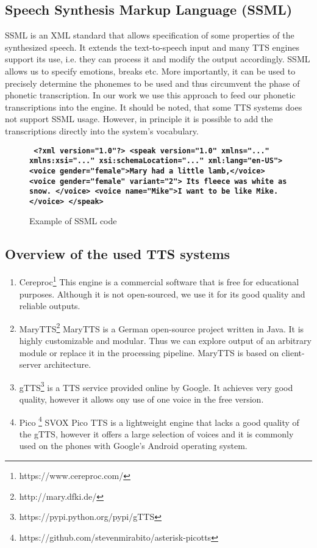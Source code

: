 \subsection*{Speech Synthesis Markup Language (SSML)}
\label{SSML}
\cite{taylor1997ssml}
SSML is an XML standard that allows specification of some properties of the synthesized speech.
It extends the text-to-speech input and many TTS engines support its use, i.e. they can process it and modify the output accordingly.
SSML allows us to specify emotions, breaks etc.
More importantly, it can be used to precisely determine the phonemes to be used and thus circumvent the phase of phonetic transcription.
In our work we use this approach to feed our phonetic transcriptions into the engine.
It should be noted, that some TTS systems does not support SSML usage.
However, in principle it is possible to add the transcriptions directly into the system's vocabulary.
\begin{center}
\begin{figure}
\textbf{\texttt{
<?xml version="1.0"?>
<speak version="1.0" xmlns="..."
         xmlns:xsi="..."
         xsi:schemaLocation="..."
         xml:lang="en-US">\linebreak
  \tab <voice gender="female">Mary had a little lamb,</voice>\linebreak
  \tab <voice gender="female" variant="2">\linebreak
  \tab\tab Its fleece was white as snow.\linebreak
  \tab</voice>\linebreak
  \tab<voice name="Mike">I want to be like Mike.</voice>\linebreak
</speak>
}}
\label{ssml_example}
\caption{Example of SSML code}
\end{figure}
\end{center}

\subsection*{Overview of the used TTS systems}
\begin{enumerate}
\item Cereproc\footnote{https://www.cereproc.com/}
This engine is a commercial software that is free for educational purposes.
Although it is not open-sourced, we use it for its good quality and reliable outputs.
\item MaryTTS\footnote{http://mary.dfki.de/} MaryTTS is a German open-source project written in Java.
It is highly customizable and modular.
Thus we can explore output of an arbitrary module or replace it in the processing pipeline.
MaryTTS is based on client-server architecture.
\item gTTS\footnote{https://pypi.python.org/pypi/gTTS} is a TTS service provided online by Google.
It achieves very good quality, however it allows ony use of one voice in the free version.
\item Pico \footnote{https://github.com/stevenmirabito/asterisk-picotts} SVOX Pico TTS is a lightweight engine that lacks a good quality of the gTTS, however it offers a large selection of voices and it is commonly used on the phones with Google's Android operating system.

\end{enumerate}

